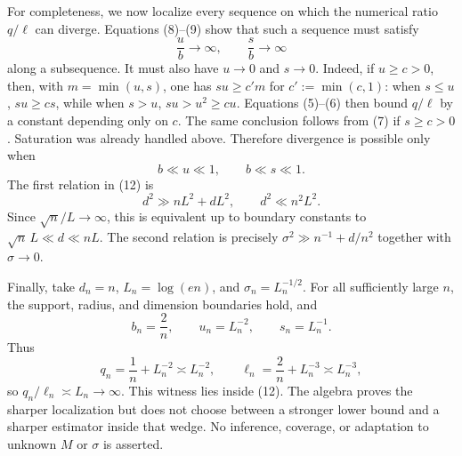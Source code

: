 For completeness, we now localize every sequence on which the numerical ratio \(q/\ell\) can diverge.  Equations (8)--(9) show that such a sequence must satisfy
\[
 \frac ub\longrightarrow\infty,
 \qquad
 \frac sb\longrightarrow\infty
\tag{11}
\]
along a subsequence.  It must also have \(u\to0\) and \(s\to0\).  Indeed, if \(u\ge c>0\), then, with \(m=\min(u,s)\), one has \(su\ge c' m\) for \(c':=\min(c,1)\): when \(s\le u\), \(su\ge cs\), while when \(s>u\), \(su>u^2\ge cu\).  Equations (5)--(6) then bound \(q/\ell\) by a constant depending only on \(c\).  The same conclusion follows from (7) if \(s\ge c>0\).  Saturation was already handled above.  Therefore divergence is possible only when
\[
 b\ll u\ll1,
 \qquad b\ll s\ll1.
\tag{12}
\]
The first relation in (12) is
\[
 d^2\gg nL^2+dL^2,
 \qquad d^2\ll n^2L^2.
\]
Since \(\sqrt n/L\to\infty\), this is equivalent up to boundary constants to \(\sqrt n\,L\ll d\ll nL\).  The second relation is precisely \(\sigma^2\gg n^{-1}+d/n^2\) together with \(\sigma\to0\).

Finally, take \(d_n=n\), \(L_n=\log(en)\), and \(\sigma_n=L_n^{-1/2}\).  For all sufficiently large \(n\), the support, radius, and dimension boundaries hold, and
\[
 b_n=\frac2n,\qquad u_n=L_n^{-2},\qquad s_n=L_n^{-1}.
\]
Thus
\[
 q_n=\frac1n+L_n^{-2}\asymp L_n^{-2},
 \qquad
 \ell_n=\frac2n+L_n^{-3}\asymp L_n^{-3},
\]
so \(q_n/\ell_n\asymp L_n\to\infty\).  This witness lies inside (12).  The algebra proves the sharper localization but does not choose between a stronger lower bound and a sharper estimator inside that wedge.  No inference, coverage, or adaptation to unknown \(M\) or \(\sigma\) is asserted.